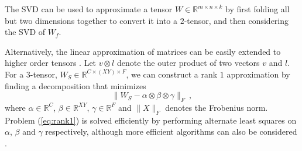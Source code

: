 The SVD can be used to approximate a tensor $W \in \mathbb{R}^{m \times n \times k}$
by first folding all but two dimensions together to convert it into a $2$-tensor, %
and then considering the SVD of $W_f$. 

Alternatively, 
the linear approximation of matrices can be easily extended to higher order tensors \cite{rankonetensors}.
Let $v \otimes l$ denote the outer product of two vectors $v$ and $l$.
For a 3-tensor, $W_S \in \mathbb{R}^{C \times (XY) \times F}$, we can construct a rank $1$ approximation by finding a decomposition that minimizes 
\begin{equation}
\label{eq:rank1}
	\| W_S - \alpha \otimes \beta \otimes \gamma \|_F~,
\end{equation} 
where $\alpha \in \mathbb{R}^C$, $\beta \in \mathbb{R}^{XY}$, $\gamma \in \mathbb{R}^F$ and $\|X\|_F$ denotes the Frobenius norm.
Problem (\ref{eq:rank1}) is solved efficiently by performing alternate least squares 
on $\alpha$, $\beta$ and $\gamma$ respectively, although more efficient algorithms can also be 
considered \cite{rankonetensors}. 

